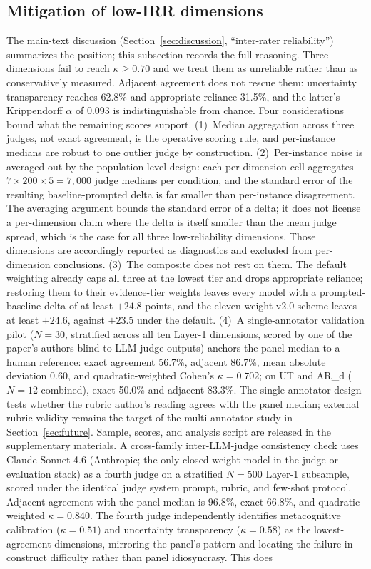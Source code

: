 \documentclass{article}
\begin{document}
\subsection{Mitigation of low-IRR dimensions}
\label{app:irr_mitigation}

The main-text discussion (Section~\ref{sec:discussion}, ``inter-rater reliability'') summarizes the position; this subsection records the full reasoning. Three dimensions fail to reach $\kappa \geq 0.70$ and we treat them as unreliable rather than as conservatively measured. Adjacent agreement does not rescue them: uncertainty transparency reaches 62.8\% and appropriate reliance 31.5\%, and the latter's Krippendorff $\alpha$ of 0.093 is indistinguishable from chance. Four considerations bound what the remaining scores support. (1)~Median aggregation across three judges, not exact agreement, is the operative scoring rule, and per-instance medians are robust to one outlier judge by construction. (2)~Per-instance noise is averaged out by the population-level design: each per-dimension cell aggregates $7 \times 200 \times 5 = 7{,}000$ judge medians per condition, and the standard error of the resulting baseline-prompted delta is far smaller than per-instance disagreement. The averaging argument bounds the standard error of a delta; it does not license a per-dimension claim where the delta is itself smaller than the mean judge spread, which is the case for all three low-reliability dimensions. Those dimensions are accordingly reported as diagnostics and excluded from per-dimension conclusions. (3)~The composite does not rest on them. The default weighting already caps all three at the lowest tier and drops appropriate reliance; restoring them to their evidence-tier weights leaves every model with a prompted-baseline delta of at least $+24.8$ points, and the eleven-weight v2.0 scheme leaves at least $+24.6$, against $+23.5$ under the default. (4)~A single-annotator validation pilot ($N = 30$, stratified across all ten Layer-1 dimensions, scored by one of the paper's authors blind to LLM-judge outputs) anchors the panel median to a human reference: exact agreement 56.7\%, adjacent 86.7\%, mean absolute deviation 0.60, and quadratic-weighted Cohen's $\kappa = 0.702$; on UT and AR\_d ($N = 12$ combined), exact 50.0\% and adjacent 83.3\%. The single-annotator design tests whether the rubric author's reading agrees with the panel median; external rubric validity remains the target of the multi-annotator study in Section~\ref{sec:future}. Sample, scores, and analysis script are released in the supplementary materials. A cross-family inter-LLM-judge consistency check uses Claude Sonnet 4.6 (Anthropic; the only closed-weight model in the judge or evaluation stack) as a fourth judge on a stratified $N = 500$ Layer-1 subsample, scored under the identical judge system prompt, rubric, and few-shot protocol. Adjacent agreement with the panel median is 96.8\%, exact 66.8\%, and quadratic-weighted $\kappa = 0.840$. The fourth judge independently identifies metacognitive calibration ($\kappa = 0.51$) and uncertainty transparency ($\kappa = 0.58$) as the lowest-agreement dimensions, mirroring the panel's pattern and locating the failure in construct difficulty rather than panel idiosyncrasy. This does 
\end{document}
